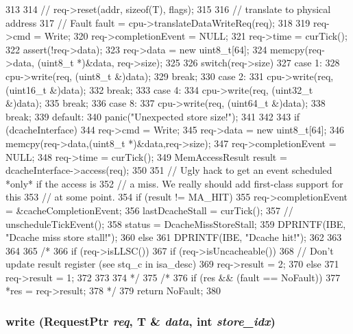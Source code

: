 \begin{DoxyCode}
313 {
314 //    req->reset(addr, sizeof(T), flags);
315 
316     // translate to physical address
317 //    Fault fault = cpu->translateDataWriteReq(req);
318 
319     req->cmd = Write;
320     req->completionEvent = NULL;
321     req->time = curTick();
322     assert(!req->data);
323     req->data = new uint8_t[64];
324     memcpy(req->data, (uint8_t *)&data, req->size);
325 
326     switch(req->size) {
327       case 1:
328         cpu->write(req, (uint8_t &)data);
329         break;
330       case 2:
331         cpu->write(req, (uint16_t &)data);
332         break;
333       case 4:
334         cpu->write(req, (uint32_t &)data);
335         break;
336       case 8:
337         cpu->write(req, (uint64_t &)data);
338         break;
339       default:
340         panic("Unexpected store size!\n");
341     }
342 
343     if (dcacheInterface) {
344         req->cmd = Write;
345         req->data = new uint8_t[64];
346         memcpy(req->data,(uint8_t *)&data,req->size);
347         req->completionEvent = NULL;
348         req->time = curTick();
349         MemAccessResult result = dcacheInterface->access(req);
350 
351         // Ugly hack to get an event scheduled *only* if the access is
352         // a miss.  We really should add first-class support for this
353         // at some point.
354         if (result != MA_HIT) {
355             req->completionEvent = &cacheCompletionEvent;
356             lastDcacheStall = curTick();
357 //          unscheduleTickEvent();
358             status = DcacheMissStoreStall;
359             DPRINTF(IBE, "Dcache miss store stall!\n");
360         } else {
361             DPRINTF(IBE, "Dcache hit!\n");
362 
363         }
364     }
365 /*
366     if (req->isLLSC()) {
367         if (req->isUncacheable()) {
368             // Don't update result register (see stq_c in isa_desc)
369             req->result = 2;
370         } else {
371             req->result = 1;
372         }
373     }
374 */
375 /*
376     if (res && (fault == NoFault))
377         *res = req->result;
378         */
379     return NoFault;
380 }
\end{DoxyCode}
\hypertarget{classInorderBackEnd_abbf7bcc93511421a1787650a43e2642a}{
\subsubsection[{write}]{ write ({\bf RequestPtr} {\em req}, \/  T \& {\em data}, \/  int {\em store\_\-idx})}}
